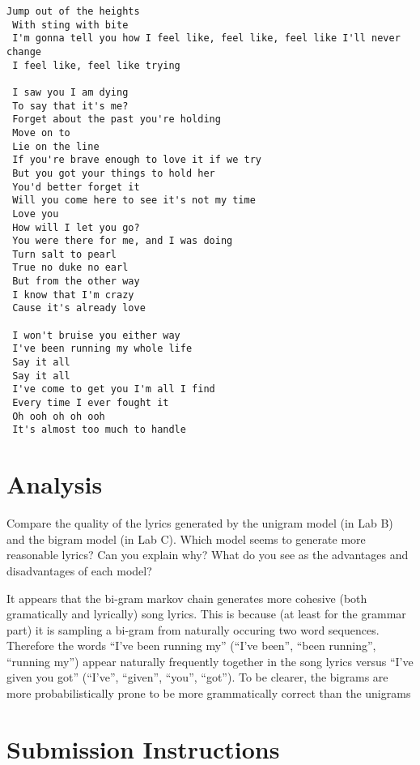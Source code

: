 \documentclass[11pt]{article}
\begin{document}
    \begin{Verbatim}[commandchars=\\\{\}]
Jump out of the heights 
 With sting with bite 
 I'm gonna tell you how I feel like, feel like, feel like I'll never change 
 I feel like, feel like trying 
 
 I saw you I am dying 
 To say that it's me? 
 Forget about the past you're holding 
 Move on to 
 Lie on the line 
 If you're brave enough to love it if we try 
 But you got your things to hold her 
 You'd better forget it 
 Will you come here to see it's not my time 
 Love you 
 How will I let you go? 
 You were there for me, and I was doing 
 Turn salt to pearl 
 True no duke no earl 
 But from the other way 
 I know that I'm crazy 
 Cause it's already love 
 
 I won't bruise you either way 
 I've been running my whole life 
 Say it all 
 Say it all 
 I've come to get you I'm all I find 
 Every time I ever fought it 
 Oh ooh oh oh ooh 
 It's almost too much to handle

    \end{Verbatim}

    \hypertarget{analysis}{%
\section{Analysis}\label{analysis}}

Compare the quality of the lyrics generated by the unigram model (in Lab
B) and the bigram model (in Lab C). Which model seems to generate more
reasonable lyrics? Can you explain why? What do you see as the
advantages and disadvantages of each model?

    It appears that the bi-gram markov chain generates more cohesive (both
gramatically and lyrically) song lyrics. This is because (at least for
the grammar part) it is sampling a bi-gram from naturally occuring two
word sequences. Therefore the words ``I've been running my'' (``I've
been'', ``been running'', ``running my'') appear naturally frequently
together in the song lyrics versus ``I've given you got'' (``I've'',
``given'', ``you'', ``got''). To be clearer, the bigrams are more
probabilistically prone to be more grammatically correct than the
unigrams

    \hypertarget{submission-instructions}{%
\section{Submission Instructions}\label{submission-instructions}}
\end{document}
